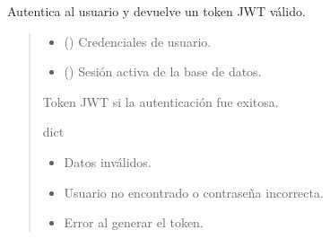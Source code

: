 \documentclass[letterpaper,10pt,spanish]{sphinxmanual}
\begin{document}

\begin{fulllineitems}
\label{\detokenize{modelos:main.login}}
\pysigstartsignatures
\pysiglinewithargsret
{}
{\sphinxparamcomma {}}
{}
\pysigstopsignatures
\sphinxAtStartPar
Autentica al usuario y devuelve un token JWT válido.
\begin{quote}\begin{description}
\begin{itemize}
\item {} 
\sphinxAtStartPar
{} ({\hyperref[\detokenize{modelos:main.UsuarioLogin}]{}}) \textendash{} Credenciales de usuario.

\item {} 
\sphinxAtStartPar
{} () \textendash{} Sesión activa de la base de datos.

\end{itemize}

\sphinxAtStartPar
Token JWT si la autenticación fue exitosa.

\sphinxAtStartPar
dict

\begin{itemize}
\item {} 
\sphinxAtStartPar
{} \textendash{} Datos inválidos.

\item {} 
\sphinxAtStartPar
{} \textendash{} Usuario no encontrado o contraseña incorrecta.

\item {} 
\sphinxAtStartPar
{} \textendash{} Error al generar el token.

\end{itemize}

\end{description}\end{quote}

\end{fulllineitems}
\end{document}
